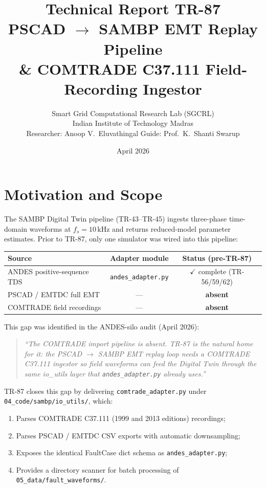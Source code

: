 \documentclass[11pt,a4paper]{article}
\title{\textbf{Technical Report TR-87}\\[4pt]
       \large PSCAD $\to$ SAMBP EMT Replay Pipeline\\
       \normalsize \& COMTRADE C37.111 Field-Recording Ingestor}
\author{Smart Grid Computational Research Lab (SGCRL)\\
        Indian Institute of Technology Madras\\[2pt]
        \small Researcher: Anoop V.\ Eluvathingal \quad
        Guide: Prof.\ K.\ Shanti Swarup}
\date{April 2026}
\begin{document}
\maketitle\tableofcontents\newpage

\section{Motivation and Scope}
\label{sec:motivation}

The SAMBP Digital Twin pipeline (TR-43–TR-45) ingests three-phase
time-domain waveforms at $f_s = 10\,\text{kHz}$ and returns reduced-model
parameter estimates.  Prior to TR-87, only one simulator was wired into
this pipeline:

\begin{center}
\begin{tabular}{lcc}
\toprule
Source & Adapter module & Status (pre-TR-87) \\
\midrule
ANDES positive-sequence TDS & \texttt{andes\_adapter.py} & $\checkmark$ complete (TR-56/59/62) \\
PSCAD / EMTDC full EMT       & --- & \textbf{absent} \\
COMTRADE field recordings    & --- & \textbf{absent} \\
\bottomrule
\end{tabular}
\end{center}

This gap was identified in the ANDES-silo audit (April 2026):
\begin{quote}
\textit{``The COMTRADE import pipeline is absent. TR-87 is the natural home
for it: the PSCAD $\to$ SAMBP EMT replay loop needs a COMTRADE C37.111
ingestor so field waveforms can feed the Digital Twin through the same
io\_utils layer that \texttt{andes\_adapter.py} already uses.''}
\end{quote}

TR-87 closes this gap by delivering \texttt{comtrade\_adapter.py}
under \texttt{04\_code/sambp/io\_utils/}, which:
\begin{enumerate}
  \item Parses COMTRADE C37.111 (1999 and 2013 editions) recordings;
  \item Parses PSCAD / EMTDC CSV exports with automatic downsampling;
  \item Exposes the identical FaultCase dict schema as \texttt{andes\_adapter.py};
  \item Provides a directory scanner for batch processing of
        \texttt{05\_data/fault\_waveforms/}.
\end{enumerate}
\end{document}
